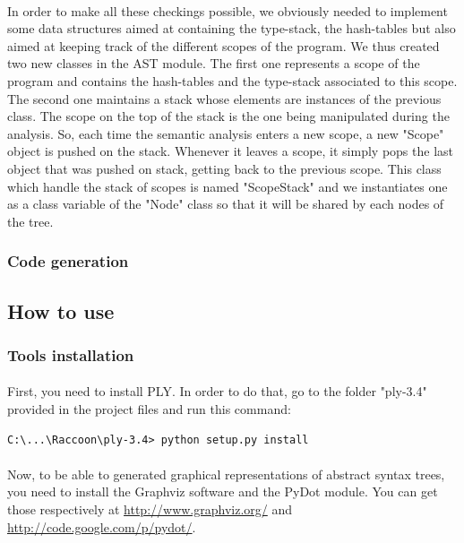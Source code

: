 \documentclass[12pt,a4paper]{article}
\begin{document}
\paragraph{}
In order to make all these checkings possible, we obviously needed to implement some data structures aimed at containing the type-stack, the hash-tables but also aimed at keeping track of the different scopes of the program. We thus created two new classes in the AST module. The first one represents a scope of the program and contains the hash-tables and the type-stack associated to this scope. The second one maintains a stack whose elements are instances of the previous class. The scope on the top of the stack is the one being manipulated during the analysis. So, each time the semantic analysis enters a new scope, a new "Scope" object is pushed on the stack. Whenever it leaves a scope, it simply pops the last object that was pushed on stack, getting back to the previous scope. This class which handle the stack of scopes is named "ScopeStack" and we instantiates one as a class variable of the "Node" class so that it will be shared by each nodes of the tree. 

\subsubsection{Code generation}

\subsection{How to use}

\subsubsection{Tools installation}
\paragraph{}
First, you need to install PLY. In order to do that, go to the folder "ply-3.4" provided in the project files and run this command:
\begin{verbatim}
C:\...\Raccoon\ply-3.4> python setup.py install
\end{verbatim}

\paragraph{}
Now, to be able to generated graphical representations of abstract syntax trees, you need to install the Graphviz software and the PyDot module. You can get those respectively at \url{http://www.graphviz.org/} and \url{http://code.google.com/p/pydot/}.
\end{document}

